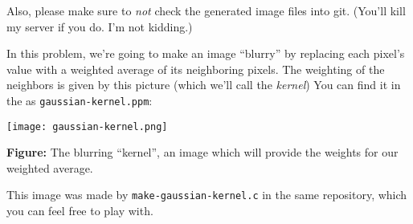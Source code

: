 \documentclass[11pt]{article}
\begin{document}
Also, please make sure to \emph{not} check the generated image files
into git. (You'll kill my server if you do. I'm not kidding.)

\bigskip
{}

In this problem, we're going to make an image ``blurry'' by replacing
each pixel's value with a weighted average of its neighboring pixels.
The weighting of the neighbors is given by this picture (which we'll call the
\emph{kernel}) You can find it in the
as \texttt{gaussian-kernel.ppm}:
\begin{center}
  \texttt{[image: gaussian-kernel.png]}

  \textbf{Figure:} The blurring ``kernel'', an
  image which will provide the weights for our weighted
  average.
\end{center}
This image was made by \texttt{make-gaussian-kernel.c} in the same
repository, which you can feel free to play with.
\end{document}
